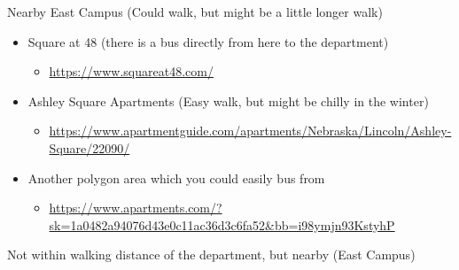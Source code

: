 \documentclass[
  12pt,
]{book}
\providecommand{\tightlist}{%
  \setlength{\itemsep}{0pt}\setlength{\parskip}{0pt}}
\begin{document}
Nearby East Campus (Could walk, but might be a little longer walk)

\begin{itemize}
\tightlist
\item
  Square at 48 (there is a bus directly from here to the department)

  \begin{itemize}
  \tightlist
  \item
    \url{https://www.squareat48.com/}
  \end{itemize}
\item
  Ashley Square Apartments (Easy walk, but might be chilly in the winter)

  \begin{itemize}
  \tightlist
  \item
    \url{https://www.apartmentguide.com/apartments/Nebraska/Lincoln/Ashley-Square/22090/}
  \end{itemize}
\item
  Another polygon area which you could easily bus from

  \begin{itemize}
  \tightlist
  \item
    \url{https://www.apartments.com/?sk=1a0482a94076d43e0c11ac36d3c6fa52\&bb=i98ymjn93KstyhP}
  \end{itemize}
\end{itemize}

Not within walking distance of the department, but nearby (East Campus)
\end{document}
